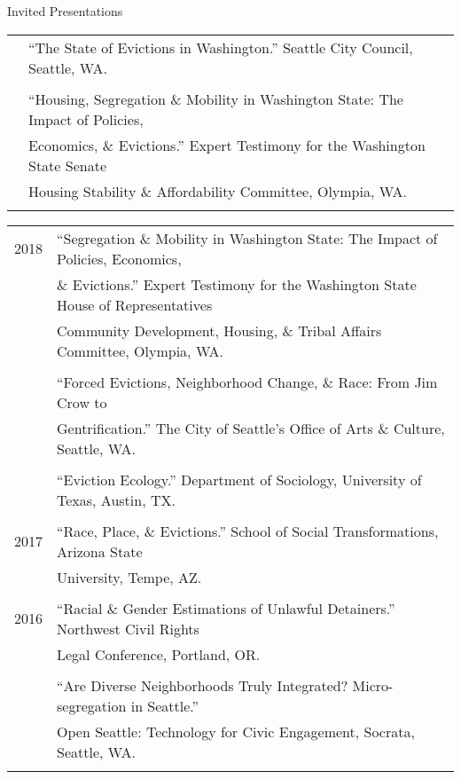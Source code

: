 \documentclass{resume} %
\begin{document}
\begin{rSection}{Invited Presentations}
\begin{tabular}{ @{} >{}l @{\hspace{6ex}} l }
		&``The State of Evictions in Washington.'' Seattle City Council, Seattle, WA.\\\\

	 	&``Housing, Segregation \& Mobility in Washington State: The Impact of Policies,\\
		& Economics, \& Evictions.'' Expert Testimony for the Washington State Senate\\
		& Housing Stability \& Affordability Committee, Olympia, WA.\\\\
\end{tabular}

\begin{tabular}{ @{} >{}l @{\hspace{6ex}} l }
2018 	& ``Segregation \& Mobility in Washington State: The Impact of Policies, Economics,\\
		& \& Evictions.'' Expert Testimony for the Washington State House of Representatives\\
		& Community Development, Housing, \& Tribal Affairs Committee, Olympia, WA.\\\\

	 	& ``Forced Evictions, Neighborhood Change, \& Race: From Jim Crow to\\
		& Gentrification.'' The City of Seattle's Office of Arts \& Culture, Seattle, WA.\\\\

	 	& ``Eviction Ecology.'' Department of Sociology, University of Texas, Austin, TX.\\\\

2017 	& ``Race, Place, \& Evictions.'' School of Social Transformations, Arizona State \\
		& University, Tempe, AZ.\\\\

2016 	& ``Racial \& Gender Estimations of Unlawful Detainers.'' Northwest Civil Rights\\
		& Legal Conference, Portland, OR.\\\\

	 	& ``Are Diverse Neighborhoods Truly Integrated? Micro-segregation in Seattle.''\\
		& Open Seattle: Technology for Civic Engagement, Socrata, Seattle, WA.\\\\


\end{tabular}
\end{rSection}
\end{document}
